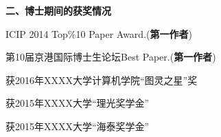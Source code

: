 \textbf{二、博士期间的获奖情况}
\begin{publist}
 \item ICIP 2014 Top\%10 Paper Award.({\bf 第一作者})
 \item 第10届京港国际博士生论坛Best Paper.({\bf 第一作者})
 \item 获2016年XXXX大学计算机学院“图灵之星”奖
 \item 获2015年XXXX大学“理光奖学金”
 \item 获2015年XXXX大学“海泰奖学金”
\end{publist}

\clearpage\mbox{}